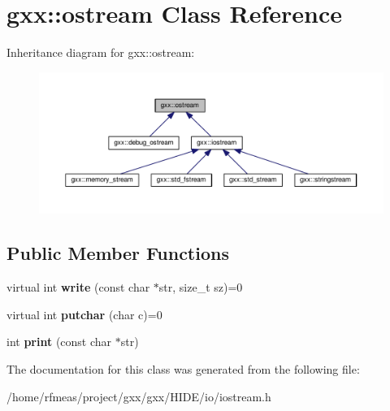 \hypertarget{classgxx_1_1ostream}{}\section{gxx\+:\+:ostream Class Reference}
\label{classgxx_1_1ostream}


Inheritance diagram for gxx\+:\+:ostream\+:
\nopagebreak
\begin{figure}[H]
\begin{center}
\leavevmode
\includegraphics[width=350pt]{classgxx_1_1ostream__inherit__graph}
\end{center}
\end{figure}
\subsection*{Public Member Functions}
\begin{DoxyCompactItemize}
\item 
virtual int {\bfseries write} (const char $\ast$str, size\+\_\+t sz)=0\hypertarget{classgxx_1_1ostream_ac0dc6cbad9f4a4d1ad561ece405e6d55}{}\label{classgxx_1_1ostream_ac0dc6cbad9f4a4d1ad561ece405e6d55}

\item 
virtual int {\bfseries putchar} (char c)=0\hypertarget{classgxx_1_1ostream_a8380b8ab80ecafbef5bd62dc92d35b7c}{}\label{classgxx_1_1ostream_a8380b8ab80ecafbef5bd62dc92d35b7c}

\item 
int {\bfseries print} (const char $\ast$str)\hypertarget{classgxx_1_1ostream_a4ae694e633257eb7e3d097d2092e8129}{}\label{classgxx_1_1ostream_a4ae694e633257eb7e3d097d2092e8129}

\end{DoxyCompactItemize}


The documentation for this class was generated from the following file\+:\begin{DoxyCompactItemize}
\item 
/home/rfmeas/project/gxx/gxx/\+H\+I\+D\+E/io/iostream.\+h\end{DoxyCompactItemize}
